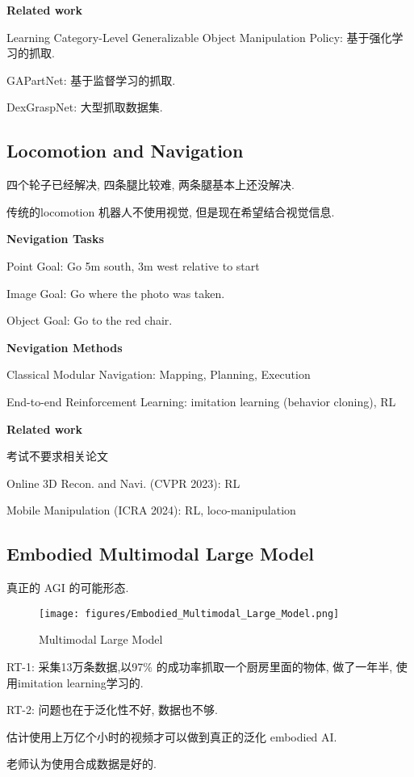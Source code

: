 \textbf{Related work}

Learning Category-Level Generalizable Object Manipulation Policy: 基于强化学习的抓取.

GAPartNet: 基于监督学习的抓取.

DexGraspNet: 大型抓取数据集.

\subsection{Locomotion and Navigation}

四个轮子已经解决, 四条腿比较难, 两条腿基本上还没解决.

传统的locomotion 机器人不使用视觉, 但是现在希望结合视觉信息.

\textbf{Nevigation Tasks}

Point Goal: Go 5m south, 3m west relative to start

Image Goal: Go where the photo was taken.

Object Goal: Go to the red chair.

\textbf{Nevigation Methods}

Classical Modular Navigation: Mapping, Planning, Execution

End-to-end Reinforcement Learning: imitation learning (behavior cloning), RL

\textbf{Related work}

考试不要求相关论文

Online 3D Recon. and Navi. (CVPR 2023): RL

Mobile Manipulation (ICRA 2024): RL, loco-manipulation

\subsection{Embodied Multimodal Large Model}

真正的 AGI 的可能形态.

\begin{figure}[H]
    \centering
    \texttt{[image: figures/Embodied\_Multimodal\_Large\_Model.png]}
    \caption{Multimodal Large Model}
\end{figure}

RT-1: 采集13万条数据,以97\% 的成功率抓取一个厨房里面的物体, 做了一年半, 使用imitation learning学习的.

RT-2: 问题也在于泛化性不好, 数据也不够.

估计使用上万亿个小时的视频才可以做到真正的泛化 embodied AI.

老师认为使用合成数据是好的.
